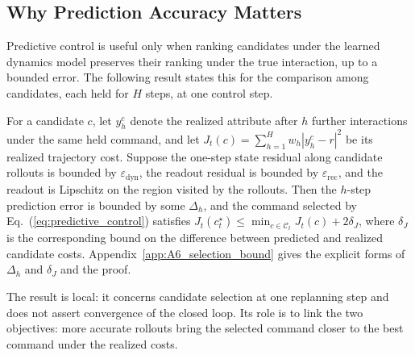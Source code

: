 \subsection{Why Prediction Accuracy Matters}
\label{sec:prediction_control_bound}

Predictive control is useful only when ranking candidates under the learned
dynamics model preserves their ranking under the true interaction, up to a bounded
error. The following result states this for the comparison among candidates,
each held for $H$ steps, at one control step.

For a candidate $c$, let $y_h^c$ denote the realized attribute after
$h$ further interactions under the same held command, and let
$J_t(c)=\sum_{h=1}^{H}w_h|y_h^c-r|^2$ be its realized trajectory cost.
Suppose the one-step state residual along candidate rollouts is bounded by
$\varepsilon_{\mathrm{dyn}}$, the readout residual is bounded by
$\varepsilon_{\mathrm{rec}}$, and the readout is Lipschitz on the region
visited by the rollouts. Then the $h$-step prediction error is bounded by
some $\Delta_h$, and the command selected by Eq.~(\ref{eq:predictive_control})
satisfies
$J_t(c_t^\star)\leq\min_{c\in\mathcal{C}_t} J_t(c)+2\delta_J$,\label{eq:selection_bound}  %
where $\delta_J$ is the corresponding bound on the difference between
predicted and realized candidate costs. Appendix~\ref{app:A6_selection_bound}
gives the explicit forms of $\Delta_h$ and $\delta_J$ and the proof.

The result is local: it concerns candidate selection at one replanning step
and does not assert convergence of the closed loop. Its role is to link the
two objectives: more accurate rollouts bring the selected command closer to
the best command under the realized costs.